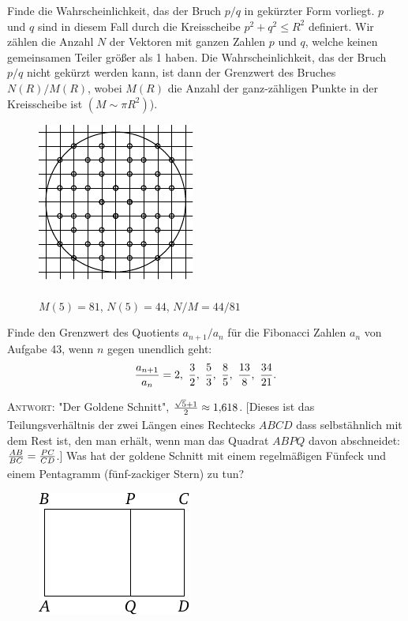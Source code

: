 \documentclass[12pt]{article} %
\begin{document}
\bigskip
{} Finde die Wahrscheinlichkeit, das der Bruch $p/q$ in gekürzter Form vorliegt. $p$ und $q$ sind in diesem Fall durch die Kreisscheibe $p^2+q^2 \leqslant R^2$ definiert. Wir zählen die Anzahl $N$ der Vektoren mit ganzen Zahlen $p$ und $q$, welche keinen gemeinsamen Teiler größer als 1 haben. Die Wahrscheinlichkeit, das der Bruch $p/q$ nicht gekürzt werden kann, ist dann der Grenzwert des Bruches $N(R)/M(R)$, wobei $M(R)$ die Anzahl der ganz-zähligen Punkte in der Kreisscheibe ist $(M \sim \pi R^2)$).
\begin{figure}[h]
\footnotesize
\centering
\includegraphics{taskbook-36}\\{\ } \\
$M(5)=81$, $N(5)=44$, $N/M = 44/81$
\end{figure}

\bigskip
{} Finde den Grenzwert des Quotients $a_{n+1}/a_n$ für die Fibonacci Zahlen $a_n$ von Aufgabe 43, wenn $n$ gegen unendlich geht: 
\vspace{2\jot}
\[
\frac{a_{n+1}}{a_n}=2,\ \frac 32,\ \frac53, \ \frac85, \ \frac{13}8,
\ \frac{34}{21}.
\vspace{\jot}
\] 

\textsc{Antwort:} "Der Goldene Schnitt",
$\frac{\sqrt{5}+1}{2\vphantom)} \approx 1{,}618$. [Dieses ist das Teilungsverhältnis der zwei Längen eines Rechtecks $ABCD$ dass selbstähnlich mit dem Rest ist, den man erhält, wenn man das Quadrat $ABPQ$ davon abschneidet: 
$\frac{AB}{BC}=\frac{PC}{CD\vphantom)}$.] Was hat der goldene Schnitt mit einem regelmäßigen Fünfeck und einem Pentagramm (fünf-zackiger Stern) zu tun?

\begin{figure}[h]
\centering
\includegraphics{taskbook-37}
\end{figure}
\end{document}
